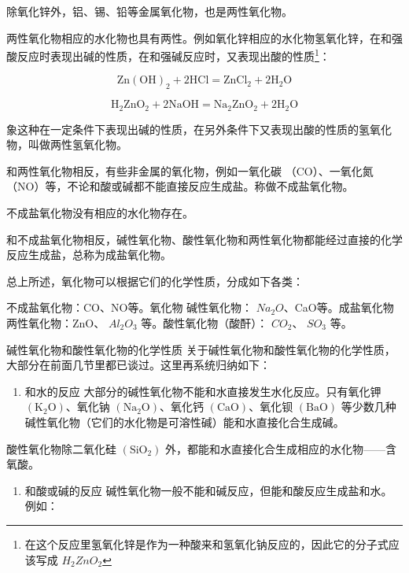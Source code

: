 除氧化锌外，铝、锡、铅等金属氧化物，也是两性氧化物。

两性氧化物相应的水化物也具有两性。例如氧化锌相应的水化物氢氧化锌，在和强酸反应时表现出碱的性质，在和强碱反应时，又表现出酸的性质\footnote{在这个反应里氢氧化锌是作为一种酸来和氢氧化钠反应的，因此它的分子式应该写成
  \(H_{2}ZnO_{2}\)}：

\[
\mathrm{Zn} (\mathrm{OH}) _ {2} + 2 \mathrm{HCl} = \mathrm{ZnCl}_{2} + 2 \mathrm{H}_{2} \mathrm{O}
\]

\[
\mathrm{H}_{2} \mathrm{ZnO}_{2} + 2 \mathrm{NaOH} = \mathrm{Na}_{2} \mathrm{ZnO}_{2} + 2 \mathrm{H}_{2} \mathrm{O}
\]

象这种在一定条件下表现出碱的性质，在另外条件下又表现出酸的性质的氢氧化物，叫做两性氢氧化物。

和两性氧化物相反，有些非金属的氧化物，例如一氧化碳
（CO）、一氧化氮（NO）等，不论和酸或碱都不能直接反应生成盐。称做不成盐氧化物。

不成盐氧化物没有相应的水化物存在。

和不成盐氧化物相反，碱性氧化物、酸性氧化物和两性氧化物都能经过直接的化学反应生成盐，总称为成盐氧化物。

总上所述，氧化物可以根据它们的化学性质，分成如下各类：

不成盐氧化物：CO、NO等。氧化物 碱性氧化物：
\(Na_{2}O\)、CaO等。成盐氧化物 两性氧化物：ZnO、 \(Al_{2}O_{3}\)
等。酸性氧化物（酸酐）： \(CO_{2}\)、 \(SO_{3}\) 等。

碱性氧化物和酸性氧化物的化学性质
关于碱性氧化物和酸性氧化物的化学性质，大部分在前面几节里都已谈过。这里再系统归纳如下：

\begin{enumerate}
\item
  和水的反应 大部分的碱性氧化物不能和水直接发生水化反应。只有氧化钾
  \(\left(\mathrm{K}_{2}\mathrm{O}\right)\)、氧化钠
  \(\left(\mathrm{Na}_{2}\mathrm{O}\right)\)、氧化钙
  \(\left(\mathrm{CaO}\right)\)、氧化钡 \(\left(\mathrm{BaO}\right)\)
  等少数几种碱性氧化物（它们的水化物是可溶性碱）能和水直接化合生成碱。
\end{enumerate}

酸性氧化物除二氧化硅 \(\left(\mathrm{SiO}_{2}\right)\)
外，都能和水直接化合生成相应的水化物------含氧酸。

\begin{enumerate}[start=2]
\item
  和酸或碱的反应
  碱性氧化物一般不能和碱反应，但能和酸反应生成盐和水。例如：
\end{enumerate}

